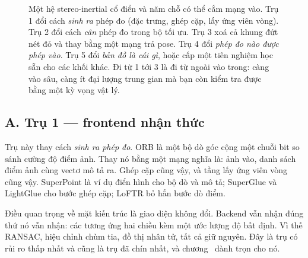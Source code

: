 \documentclass[../../deep_learning.tex]{subfiles}
\begin{document}
\begin{figure}[H]
{}
\caption{Một hệ stereo-inertial cổ điển và năm chỗ có thể cắm mạng vào. Trụ 1 đổi cách \emph{sinh ra} phép đo (đặc trưng, ghép cặp, lấy ứng viên vòng). Trụ 2 đổi cách \emph{cân} phép đo trong bộ tối ưu. Trụ 3 xoá cả khung đứt nét đỏ và thay bằng một mạng trả pose. Trụ 4 đổi \emph{phép đo nào được phép vào}. Trụ 5 đổi \emph{bản đồ là cái gì}, hoặc cấp một tiên nghiệm học sẵn cho các khối khác. Đi từ 1 tới 3 là đi từ ngoài vào trong: càng vào sâu, càng ít đại lượng trung gian mà bạn còn kiểm tra được bằng một kỳ vọng vật lý.}
\label{fig:f27-nam-tru}
\end{figure}

\subsection{A. Trụ 1 --- frontend nhận thức}
Trụ này thay cách \emph{sinh ra phép đo}. ORB là một bộ dò góc cộng một chuỗi bit so sánh cường độ điểm ảnh. Thay nó bằng một mạng nghĩa là: ảnh vào, danh sách điểm ảnh cùng vectơ mô tả ra. Ghép cặp cũng vậy, và tầng lấy ứng viên vòng cũng vậy. SuperPoint \cite{detone2018superpoint} là ví dụ điển hình cho bộ dò và mô tả; SuperGlue \cite{sarlin2020superglue} và LightGlue \cite{lindenberger2023lightglue} cho bước ghép cặp; LoFTR \cite{sun2021loftr} bỏ hẳn bước dò điểm.

Điều quan trọng về mặt kiến trúc là giao diện không đổi. Backend vẫn nhận đúng thứ nó vẫn nhận: các tương ứng hai chiều kèm một ước lượng độ bất định. Vì thế RANSAC, hiệu chỉnh chùm tia, đồ thị nhân tử, tất cả giữ nguyên. Đây là trụ có rủi ro thấp nhất và cũng là trụ đã chín nhất, và chương~ dành trọn cho nó.
\end{document}
